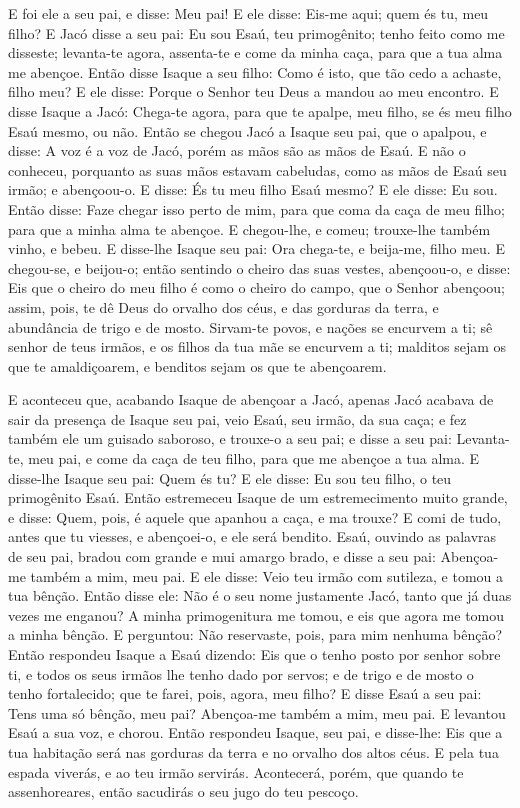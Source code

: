 E foi ele a seu pai, e disse: Meu pai! E ele disse: Eis-me aqui;
quem és tu, meu filho? E Jacó disse a seu pai: Eu sou Esaú,
teu primogênito; tenho feito como me disseste; levanta-te agora,
assenta-te e come da minha caça, para que a tua alma me abençoe.
Então disse Isaque a seu filho: Como é isto, que tão cedo a
achaste, filho meu? E ele disse: Porque o Senhor teu Deus a mandou
ao meu encontro. E disse Isaque a Jacó: Chega-te agora, para
que te apalpe, meu filho, se és meu filho Esaú mesmo, ou não.
Então se chegou Jacó a Isaque seu pai, que o apalpou, e
disse: A voz é a voz de Jacó, porém as mãos são as mãos de Esaú.
E não o conheceu, porquanto as suas mãos estavam cabeludas,
como as mãos de Esaú seu irmão; e abençoou-o. E disse: És tu
meu filho Esaú mesmo? E ele disse: Eu sou. Então disse: Faze
chegar isso perto de mim, para que coma da caça de meu filho; para
que a minha alma te abençoe. E chegou-lhe, e comeu; trouxe-lhe
também vinho, e bebeu. E disse-lhe Isaque seu pai: Ora
chega-te, e beija-me, filho meu. E chegou-se, e beijou-o;
então sentindo o cheiro das suas vestes, abençoou-o, e disse: Eis
que o cheiro do meu filho é como o cheiro do campo, que o Senhor
abençoou; assim, pois, te dê Deus do orvalho dos céus, e das
gorduras da terra, e abundância de trigo e de mosto.
Sirvam-te povos, e nações se encurvem a ti; sê senhor de teus
irmãos, e os filhos da tua mãe se encurvem a ti; malditos sejam os
que te amaldiçoarem, e benditos sejam os que te abençoarem.

E aconteceu que, acabando Isaque de abençoar a Jacó, apenas Jacó
acabava de sair da presença de Isaque seu pai, veio Esaú, seu irmão,
da sua caça; e fez também ele um guisado saboroso, e trouxe-o
a seu pai; e disse a seu pai: Levanta-te, meu pai, e come da caça de
teu filho, para que me abençoe a tua alma. E disse-lhe Isaque
seu pai: Quem és tu? E ele disse: Eu sou teu filho, o teu
primogênito Esaú. Então estremeceu Isaque de um
estremecimento muito grande, e disse: Quem, pois, é aquele que
apanhou a caça, e ma trouxe? E comi de tudo, antes que tu viesses, e
abençoei-o, e ele será bendito. Esaú, ouvindo as palavras de
seu pai, bradou com grande e mui amargo brado, e disse a seu pai:
Abençoa-me também a mim, meu pai. E ele disse: Veio teu irmão
com sutileza, e tomou a tua bênção. Então disse ele: Não é o
seu nome justamente Jacó, tanto que já duas vezes me enganou? A
minha primogenitura me tomou, e eis que agora me tomou a minha
bênção. E perguntou: Não reservaste, pois, para mim nenhuma bênção?
Então respondeu Isaque a Esaú dizendo: Eis que o tenho posto
por senhor sobre ti, e todos os seus irmãos lhe tenho dado por
servos; e de trigo e de mosto o tenho fortalecido; que te farei,
pois, agora, meu filho? E disse Esaú a seu pai: Tens uma só
bênção, meu pai? Abençoa-me também a mim, meu pai. E levantou Esaú a
sua voz, e chorou. Então respondeu Isaque, seu pai, e
disse-lhe: Eis que a tua habitação será nas gorduras da terra e no
orvalho dos altos céus. E pela tua espada viverás, e ao teu
irmão servirás. Acontecerá, porém, que quando te assenhoreares,
então sacudirás o seu jugo do teu pescoço.

